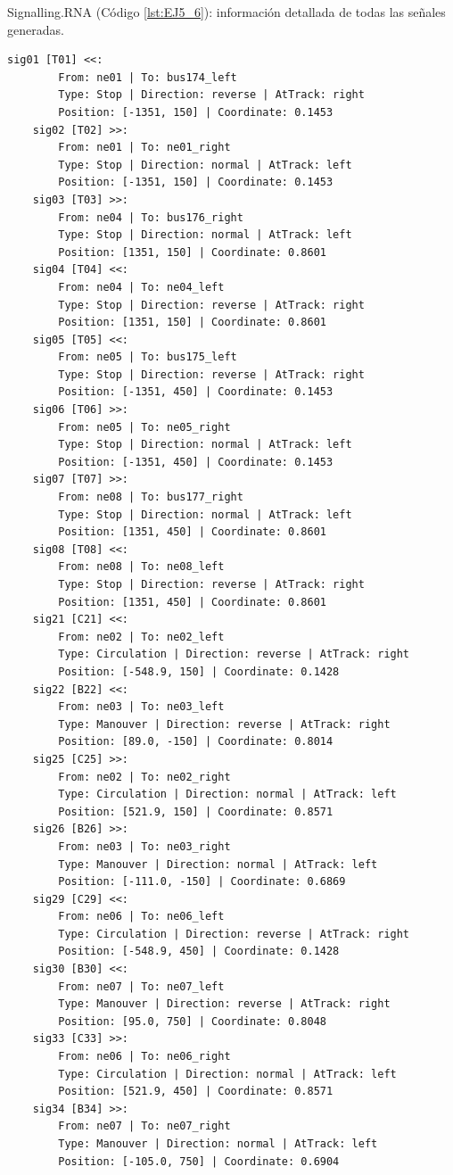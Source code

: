 	Signalling.RNA (Código \ref{lst:EJ5_6}): información detallada de todas las señales generadas.
	
	\begin{lstlisting}[language = {}, caption = Signalling.RNA, label = {lst:EJ5_6}]
	sig01 [T01] <<:
		From: ne01 | To: bus174_left
		Type: Stop | Direction: reverse | AtTrack: right 
		Position: [-1351, 150] | Coordinate: 0.1453
	sig02 [T02] >>:
		From: ne01 | To: ne01_right
		Type: Stop | Direction: normal | AtTrack: left 
		Position: [-1351, 150] | Coordinate: 0.1453
	sig03 [T03] >>:
		From: ne04 | To: bus176_right
		Type: Stop | Direction: normal | AtTrack: left 
		Position: [1351, 150] | Coordinate: 0.8601
	sig04 [T04] <<:
		From: ne04 | To: ne04_left
		Type: Stop | Direction: reverse | AtTrack: right 
		Position: [1351, 150] | Coordinate: 0.8601
	sig05 [T05] <<:
		From: ne05 | To: bus175_left
		Type: Stop | Direction: reverse | AtTrack: right 
		Position: [-1351, 450] | Coordinate: 0.1453
	sig06 [T06] >>:
		From: ne05 | To: ne05_right
		Type: Stop | Direction: normal | AtTrack: left 
		Position: [-1351, 450] | Coordinate: 0.1453
	sig07 [T07] >>:
		From: ne08 | To: bus177_right
		Type: Stop | Direction: normal | AtTrack: left 
		Position: [1351, 450] | Coordinate: 0.8601
	sig08 [T08] <<:
		From: ne08 | To: ne08_left
		Type: Stop | Direction: reverse | AtTrack: right 
		Position: [1351, 450] | Coordinate: 0.8601
	sig21 [C21] <<:
		From: ne02 | To: ne02_left
		Type: Circulation | Direction: reverse | AtTrack: right 
		Position: [-548.9, 150] | Coordinate: 0.1428
	sig22 [B22] <<:
		From: ne03 | To: ne03_left
		Type: Manouver | Direction: reverse | AtTrack: right 
		Position: [89.0, -150] | Coordinate: 0.8014
	sig25 [C25] >>:
		From: ne02 | To: ne02_right
		Type: Circulation | Direction: normal | AtTrack: left 
		Position: [521.9, 150] | Coordinate: 0.8571
	sig26 [B26] >>:
		From: ne03 | To: ne03_right
		Type: Manouver | Direction: normal | AtTrack: left 
		Position: [-111.0, -150] | Coordinate: 0.6869
	sig29 [C29] <<:
		From: ne06 | To: ne06_left
		Type: Circulation | Direction: reverse | AtTrack: right 
		Position: [-548.9, 450] | Coordinate: 0.1428
	sig30 [B30] <<:
		From: ne07 | To: ne07_left
		Type: Manouver | Direction: reverse | AtTrack: right 
		Position: [95.0, 750] | Coordinate: 0.8048
	sig33 [C33] >>:
		From: ne06 | To: ne06_right
		Type: Circulation | Direction: normal | AtTrack: left 
		Position: [521.9, 450] | Coordinate: 0.8571
	sig34 [B34] >>:
		From: ne07 | To: ne07_right
		Type: Manouver | Direction: normal | AtTrack: left 
		Position: [-105.0, 750] | Coordinate: 0.6904
	\end{lstlisting}
	
